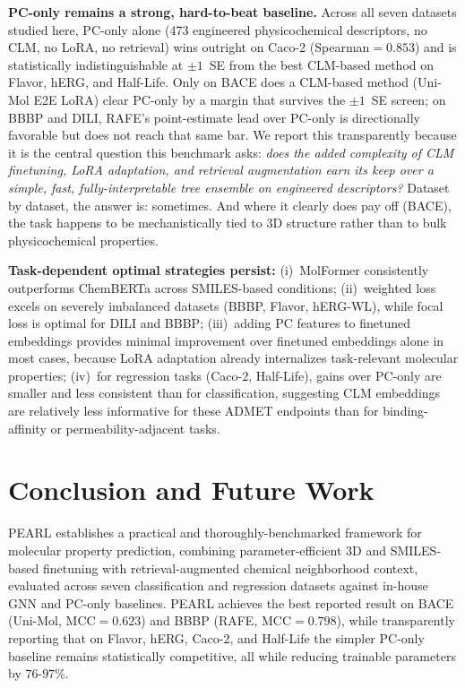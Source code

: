 \documentclass[pdflatex,sn-mathphys-num]{sn-jnl}%
\begin{document}
\textbf{PC-only remains a strong, hard-to-beat baseline.} Across all seven datasets studied here, PC-only alone (473 engineered physicochemical descriptors, no CLM, no LoRA, no retrieval) wins outright on Caco-2 (Spearman$=0.853$) and is statistically indistinguishable at $\pm1$~SE from the best CLM-based method on Flavor, hERG, and Half-Life. Only on BACE does a CLM-based method (Uni-Mol E2E LoRA) clear PC-only by a margin that survives the $\pm1$~SE screen; on BBBP and DILI, RAFE's point-estimate lead over PC-only is directionally favorable but does not reach that same bar. We report this transparently because it is the central question this benchmark asks: \emph{does the added complexity of CLM finetuning, LoRA adaptation, and retrieval augmentation earn its keep over a simple, fast, fully-interpretable tree ensemble on engineered descriptors?} Dataset by dataset, the answer is: sometimes. And where it clearly does pay off (BACE), the task happens to be mechanistically tied to 3D structure rather than to bulk physicochemical properties.

\textbf{Task-dependent optimal strategies persist:} (i)~MolFormer consistently outperforms ChemBERTa across SMILES-based conditions; (ii)~weighted loss excels on severely imbalanced datasets (BBBP, Flavor, hERG-WL), while focal loss is optimal for DILI and BBBP; (iii)~adding PC features to finetuned embeddings provides minimal improvement over finetuned embeddings alone in most cases, because LoRA adaptation already internalizes task-relevant molecular properties; (iv)~for regression tasks (Caco-2, Half-Life), gains over PC-only are smaller and less consistent than for classification, suggesting CLM embeddings are relatively less informative for these ADMET endpoints than for binding-affinity or permeability-adjacent tasks.

\section{Conclusion and Future Work}\label{sec:conclusion}

PEARL establishes a practical and thoroughly-benchmarked framework for molecular property prediction, combining parameter-efficient 3D and SMILES-based finetuning with retrieval-augmented chemical neighborhood context, evaluated across seven classification and regression datasets against in-house GNN and PC-only baselines. PEARL achieves the best reported result on BACE (Uni-Mol, MCC$=0.623$) and BBBP (RAFE, MCC$=0.798$), while transparently reporting that on Flavor, hERG, Caco-2, and Half-Life the simpler PC-only baseline remains statistically competitive, all while reducing trainable parameters by $76$-$97\%$.
\end{document}
